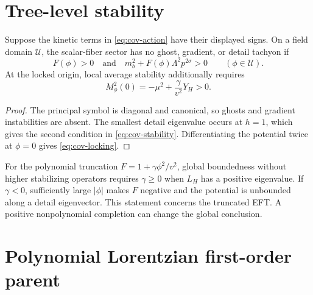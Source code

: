 \section{Tree-level stability}

\begin{theorem}
Suppose the kinetic terms in \eqref{eq:cov-action} have their displayed signs.  On a field domain $\mathcal U$, the scalar-fiber sector has no ghost, gradient, or detail tachyon if
\begin{equation}
F(\phi)>0
\quad\text{and}\quad
m_b^2+F(\phi)\Lambda^2p^{2\sigma}>0
\qquad(\phi\in\mathcal U).
\label{eq:cov-stability}
\end{equation}
At the locked origin, local average stability additionally requires
\begin{equation}
\boxed{
M_\phi^2(0)
=-\mu^2+\frac\gamma{v^2}Y_H>0.}
\label{eq:cov-locking}
\end{equation}
\end{theorem}

\begin{proof}
The principal symbol is diagonal and canonical, so ghosts and gradient instabilities are absent.  The smallest detail eigenvalue occurs at $h=1$, which gives the second condition in \eqref{eq:cov-stability}.  Differentiating the potential twice at $\phi=0$ gives \eqref{eq:cov-locking}.
\end{proof}

For the polynomial truncation $F=1+\gamma\phi^2/v^2$, global boundedness without higher stabilizing operators requires $\gamma\ge0$ when $L_H$ has a positive eigenvalue.  If $\gamma<0$, sufficiently large $|\phi|$ makes $F$ negative and the potential is unbounded along a detail eigenvector.  This statement concerns the truncated EFT.  A positive nonpolynomial completion can change the global conclusion.

\section{Polynomial Lorentzian first-order parent}

